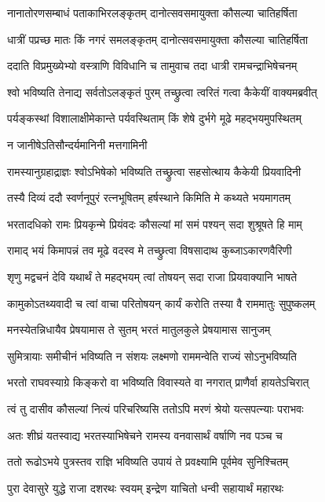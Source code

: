 \twolineshloka
{नानातोरणसम्बाधं पताकाभिरलङ्कृतम्}
{दानोत्सवसमायुक्ता कौसल्या चातिहर्षिता} %

\twolineshloka
{धात्रीं पप्रच्छ मातः किं नगरं समलङ्कृतम्}
{दानोत्सवसमायुक्ता कौसल्या चातिहर्षिता} %

\twolineshloka
{ददाति विप्रमुख्येभ्यो वस्त्राणि विविधानि च}
{तामुवाच तदा धात्री रामचन्द्राभिषेचनम्} %

\twolineshloka
{श्वो भविष्यति तेनाद्य सर्वतोऽलङ्कृतं पुरम्}
{तच्छ्रुत्वा त्वरितं गत्वा कैकेयीं वाक्यमब्रवीत्} %

\twolineshloka
{पर्यङ्कस्थां विशालाक्षीमेकान्ते पर्यवस्थिताम्}
{किं शेषे दुर्भगे मूढे महद्भयमुपस्थितम्} %

\onelineshloka
{न जानीषेऽतिसौन्दर्यमानिनी मत्तगामिनी} %

\twolineshloka
{रामस्यानुग्रहाद्राज्ञः श्वोऽभिषेको भविष्यति}
{तच्छ्रुत्वा सहसोत्थाय कैकेयी प्रियवादिनी} %

\twolineshloka
{तस्यै दिव्यं ददौ स्वर्णनूपुरं रत्नभूषितम्}
{हर्षस्थाने किमिति मे कथ्यते भयमागतम्} %

\twolineshloka
{भरतादधिको रामः प्रियकृन्मे प्रियंवदः}
{कौसल्यां मां समं पश्यन् सदा शुश्रूषते हि माम्} %

\twolineshloka
{रामाद् भयं किमापन्नं तव मूढे वदस्व मे}
{तच्छ्रुत्वा विषसादाथ कुब्जाऽकारणवैरिणी} %

\twolineshloka
{शृणु मद्वचनं देवि यथार्थं ते महद्भयम्}
{त्वां तोषयन् सदा राजा प्रियवाक्यानि भाषते} %

\twolineshloka
{कामुकोऽतथ्यवादी च त्वां वाचा परितोषयन्}
{कार्यं करोति तस्या वै राममातुः सुपुष्कलम्} %

\twolineshloka
{मनस्येतन्निधायैव प्रेषयामास ते सुतम्}
{भरतं मातुलकुले प्रेषयामास सानुजम्} %

\twolineshloka
{सुमित्रायाः समीचीनं भविष्यति न संशयः}
{लक्ष्मणो राममन्वेति राज्यं सोऽनुभविष्यति} %

\twolineshloka
{भरतो राघवस्याग्रे किङ्करो वा भविष्यति}
{विवास्यते वा नगरात् प्राणैर्वा हायतेऽचिरात्} %

\twolineshloka
{त्वं तु दासीव कौसल्यां नित्यं परिचरिष्यसि}
{ततोऽपि मरणं श्रेयो यत्सपत्न्याः पराभवः} %

\twolineshloka
{अतः शीघ्रं यतस्वाद्य भरतस्याभिषेचने}
{रामस्य वनवासार्थं वर्षाणि नव पञ्च च} %

\twolineshloka
{ततो रूढोऽभये पुत्रस्तव राज्ञि भविष्यति}
{उपायं ते प्रवक्ष्यामि पूर्वमेव सुनिश्चितम्} %

\twolineshloka
{पुरा देवासुरे युद्धे राजा दशरथः स्वयम्}
{इन्द्रेण याचितो धन्वी सहायार्थं महारथः} %

